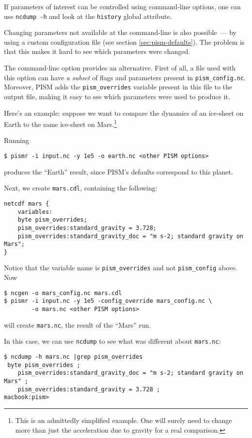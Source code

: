 If parameters of interest can be controlled using command-line options, one can use \verb|ncdump -h| and look at the \verb|history| global attribute.

Changing parameters not available at the command-line is also possible~--- by using a custom configuration file (see section \ref{sec:pism-defaults}). The problem is that this makes it hard to see which parameters were changed.

The  command-line option provides an alternative. First of all, a file used with this option can have \emph{a subset} of flags and parameters present in \verb|pism_config.nc|. Moreover, PISM adds the \verb|pism_overrides| variable present in this file to the output file, making it easy to see which parameters were used to produce it.

Here's an example: suppose we want to compare the dynamics of an ice-sheet on Earth to the same ice-sheet on Mars.\footnote{This is an admittedly simplified example. One will surely need to change more than just the acceleration due to gravity for a real comparison.}

Running
\begin{verbatim}
$ pismr -i input.nc -y 1e5 -o earth.nc <other PISM options>
\end{verbatim}
produces the ``Earth'' result, since PISM's defaults correspond to this planet.

Next, we create \verb|mars.cdl|, containing the following:
\small
\begin{verbatim}
netcdf mars {
    variables:
    byte pism_overrides;
    pism_overrides:standard_gravity = 3.728;
    pism_overrides:standard_gravity_doc = "m s-2; standard gravity on Mars";
}
\end{verbatim}
\normalsize
Notice that the variable name is \verb|pism_overrides| and not \verb|pism_config| above. Now
\begin{verbatim}
$ ncgen -o mars_config.nc mars.cdl
$ pismr -i input.nc -y 1e5 -config_override mars_config.nc \
        -o mars.nc <other PISM options>
\end{verbatim}
will create \verb|mars.nc|, the result of the ``Mars'' run.

In this case, we can use \verb|ncdump| to see what was different about \verb|mars.nc|:
\small
\begin{verbatim}
$ ncdump -h mars.nc |grep pism_overrides
 byte pism_overrides ;
    pism_overrides:standard_gravity_doc = "m s-2; standard gravity on Mars" ;
    pism_overrides:standard_gravity = 3.728 ;
macbook:pism>
\end{verbatim}
\normalsize


